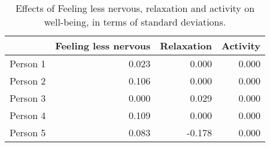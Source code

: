 \begin{table}[ht]
\centering
\begin{tabular}{rrrr}
  \toprule
 & Feeling less nervous & Relaxation & Activity \\ 
  \midrule
Person 1 & 0.023 & 0.000 & 0.000 \\ 
  Person 2 & 0.106 & 0.000 & 0.000 \\ 
  Person 3 & 0.000 & 0.029 & 0.000 \\ 
  Person 4 & 0.109 & 0.000 & 0.000 \\ 
  Person 5 & 0.083 & -0.178 & 0.000 \\ 
   \bottomrule
\end{tabular}
\caption{Effects of Feeling less nervous, relaxation and activity on well-being, in terms of standard deviations.} 
\label{tab:effects_in_aira}
\end{table}
